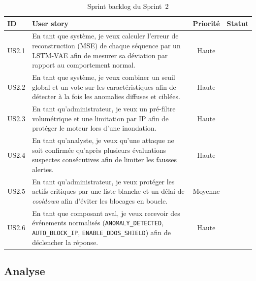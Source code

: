\begin{table}[H]
\centering
\caption{Sprint backlog du Sprint~2}
\label{tab:backlog-s2}
\small
\begin{tabularx}{\textwidth}{@{}l>{\raggedright\arraybackslash}Xcc@{}}
\toprule
\textbf{ID} & \textbf{User story} & \textbf{Priorité} & \textbf{Statut} \\
\midrule
US2.1 & En tant que système, je veux calculer l'erreur de reconstruction (MSE) de chaque séquence par un LSTM-VAE afin de mesurer sa déviation par rapport au comportement normal. & Haute & \A{statut} \\
US2.2 & En tant que système, je veux combiner un seuil global et un vote sur les caractéristiques afin de détecter à la fois les anomalies diffuses et ciblées. & Haute & \A{statut} \\
US2.3 & En tant qu'administrateur, je veux un pré-filtre volumétrique et une limitation par IP afin de protéger le moteur lors d'une inondation. & Haute & \A{statut} \\
US2.4 & En tant qu'analyste, je veux qu'une attaque ne soit confirmée qu'après plusieurs évaluations suspectes consécutives afin de limiter les fausses alertes. & Haute & \A{statut} \\
US2.5 & En tant qu'administrateur, je veux protéger les actifs critiques par une liste blanche et un délai de \emph{cooldown} afin d'éviter les blocages en boucle. & Moyenne & \A{statut} \\
US2.6 & En tant que composant aval, je veux recevoir des événements normalisés (\texttt{ANOMALY\_DETECTED}, \texttt{AUTO\_BLOCK\_IP}, \texttt{ENABLE\_DDOS\_SHIELD}) afin de déclencher la réponse. & Haute & \A{statut} \\
\bottomrule
\end{tabularx}
\end{table}

\subsection{Analyse}


